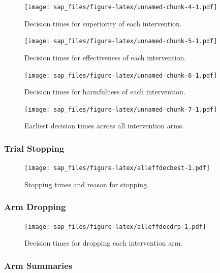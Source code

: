 \documentclass[
  bibliography=totoc]{scrreprt}
\begin{document}
\begin{figure}
\centering
\texttt{[image: sap\_files/figure-latex/unnamed-chunk-4-1.pdf]}
\caption{\label{fig:unnamed-chunk-4}Decision times for superiority of each intervention.}
\end{figure}

\begin{figure}
\centering
\texttt{[image: sap\_files/figure-latex/unnamed-chunk-5-1.pdf]}
\caption{\label{fig:unnamed-chunk-5}Decision times for effectiveness of each intervention.}
\end{figure}

\begin{figure}
\centering
\texttt{[image: sap\_files/figure-latex/unnamed-chunk-6-1.pdf]}
\caption{\label{fig:unnamed-chunk-6}Decision times for harmfulness of each intervention.}
\end{figure}

\begin{figure}
\centering
\texttt{[image: sap\_files/figure-latex/unnamed-chunk-7-1.pdf]}
\caption{\label{fig:unnamed-chunk-7}Earliest decision times across all intervention arms.}
\end{figure}

\clearpage

\hypertarget{trial-stopping}{%
\subsubsection{Trial Stopping}\label{trial-stopping}}

\begin{figure}
\centering
\texttt{[image: sap\_files/figure-latex/alleffdecbest-1.pdf]}
\caption{\label{fig:alleffdecbest}Stopping times and reason for stopping.}
\end{figure}

\clearpage

\hypertarget{arm-dropping}{%
\subsubsection{Arm Dropping}\label{arm-dropping}}

\begin{figure}
\centering
\texttt{[image: sap\_files/figure-latex/alleffdecdrp-1.pdf]}
\caption{\label{fig:alleffdecdrp}Decision times for dropping each intervention arm.}
\end{figure}

\clearpage

\hypertarget{arm-summaries}{%
\subsubsection{Arm Summaries}\label{arm-summaries}}
\end{document}
